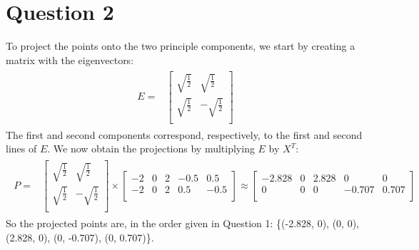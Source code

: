 \documentclass[leqno]{article}
\begin{document}
\hfill

\section*{Question 2} To project the points onto the two principle components, we start by creating a matrix with the eigenvectors: 
\begin{gather*}
\begin{split}
E =
&\begin{bmatrix}
    \sqrt{\frac{1}{2}} & \sqrt{\frac{1}{2}} \\
    \sqrt{\frac{1}{2}} & -\sqrt{\frac{1}{2}}\\
\end{bmatrix}
\end{split}
\end{gather*}
The first and second components correspond, respectively, to the first and second lines of $E$. We now obtain the projections by 
multiplying $E$ by $X^T$:
\begin{gather*}
\begin{split}
P =
&\begin{bmatrix}
    \sqrt{\frac{1}{2}} & \sqrt{\frac{1}{2}} \\
    \sqrt{\frac{1}{2}} & -\sqrt{\frac{1}{2}}\\
\end{bmatrix} \times
\begin{bmatrix} 
   -2 & 0 & 2 & -0.5 & 0.5\\
   -2 & 0 & 2 & 0.5 & -0.5\\
\end{bmatrix} \approx
\begin{bmatrix} 
   -2.828 &  0 & 2.828 &  0 &  0\\
   0 & 0 & 0 & -0.707 & 0.707\\
\end{bmatrix}
\end{split}
\end{gather*}
So the projected points are, in the order given in Question 1: \{(-2.828, 0), (0, 0), (2.828, 0), (0, -0.707), (0, 0.707)\}.

\hfill
\end{document}
